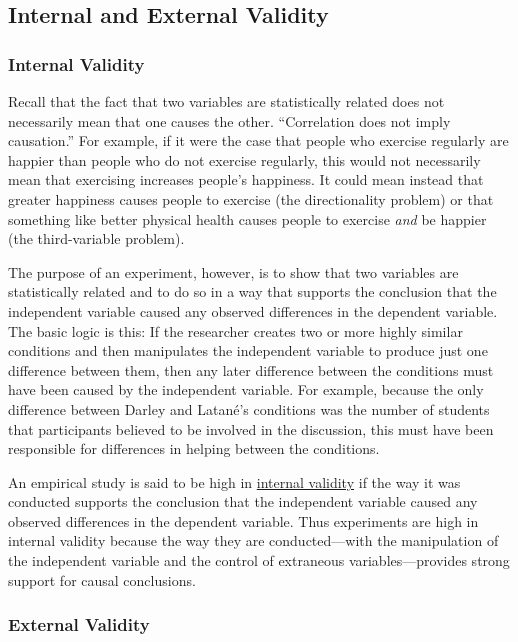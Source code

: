 \documentclass[
]{krantz}
\begin{document}
\subsection*{Internal and External Validity}\label{internal-and-external-validity}


\subsubsection*{Internal Validity}\label{internal-validity}


Recall that the fact that two variables are statistically related does not necessarily mean that one causes the other. ``Correlation does not imply causation.'' For example, if it were the case that people who exercise regularly are happier than people who do not exercise regularly, this would not necessarily mean that exercising increases people's happiness. It could mean instead that greater happiness causes people to exercise (the directionality problem) or that something like better physical health causes people to exercise \emph{and} be happier (the third-variable problem).

The purpose of an experiment, however, is to show that two variables are statistically related and to do so in a way that supports the conclusion that the independent variable caused any observed differences in the dependent variable. The basic logic is this: If the researcher creates two or more highly similar conditions and then manipulates the independent variable to produce just one difference between them, then any later difference between the conditions must have been caused by the independent variable. For example, because the only difference between Darley and Latané's conditions was the number of students that participants believed to be involved in the discussion, this must have been responsible for differences in helping between the conditions.

An empirical study is said to be high in \hyperref[internal-validity]{internal validity} if the way it was conducted supports the conclusion that the independent variable caused any observed differences in the dependent variable. Thus experiments are high in internal validity because the way they are conducted---with the manipulation of the independent variable and the control of extraneous variables---provides strong support for causal conclusions.

\subsubsection*{External Validity}\label{external-validity}
\end{document}
